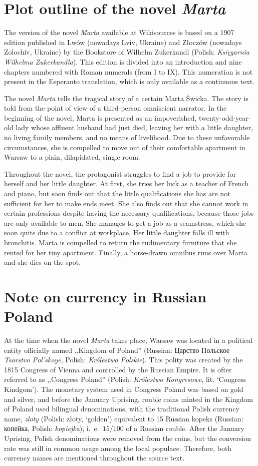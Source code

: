\section{Plot outline of the novel \textit{Marta}}
The version of the novel \textit{Marta} available at Wikisources is based on a 1907 edition published in Lwów (nowadays Lviv, Ukraine) and Złoczów (nowadays Zolochiv, Ukraine) by the Bookstore of Wilhelm Zukerkandl (Polish: \textit{Księgarnia Wilhelma Zukerkandla}).
This edition is divided into an introduction and nine chapters numbered with Roman numerals (from I to IX).
This numeration is not present in the Esperanto translation, which is only available as a continuous text.

The novel \textit{Marta} tells the tragical story of a certain Marta Świcka.
The story is told from the point of view of a third-person omniscient narrator.
In the beginning of the novel, Marta is presented as an impoverished, twenty-odd-year-old lady whose affluent husband had just died, leaving her with a little daughter, no living family members, and no means of livelihood.
Due to these unfavorable circumstances, she is compelled to move out of their comfortable apartment in Warsaw to a plain, dilapidated, single room.

Throughout the novel, the protagonist struggles to find a job to provide for herself and her little daughter.
At first, she tries her luck as a teacher of French and piano, but soon finds out that the little qualifications she has are not sufficient for her to make ends meet.
She also finds out that she cannot work in certain professions despite having the necessary qualifications, because those jobs are only available to men.
She manages to get a job as a seamstress, which she soon quits due to a conflict at workplace.
Her little daughter falls ill with bronchitis.
Marta is compelled to return the rudimentary furniture that she rented for her tiny apartment.
Finally, a horse-drawn omnibus runs over Marta and she dies on the spot.

\section{Note on currency in Russian Poland}

At the time when the novel \textit{Marta} takes place, Warsaw was located in a political entity officially named ,,Kingdom of Poland'' (Russian: {\cyrfont Царство Польское} \textit{Tsarstvo Pol'skoye}, Polish: \textit{Królestwo Polskie}).
This polity was created by the 1815 Congress of Vienna and controlled by the Russian Empire.
It is ofter referred to as ,,Congress Poland'' (Polish: \textit{Królestwo Kongresowe}, lit. `Congress Kindgom').
The monetary system used in Congress Poland was based on gold and silver, and before the January Uprising, rouble coins minted in the Kingdom of Poland used bilingual denominations, with the traditional Polish currency name, \textit{zloty} (Polish: złoty, `golden') equivalent to 15 Russian kopeks (Russian: копейка, Polish: \textit{kopiejka}), i.\ e.\ $15/100$ of a Russian rouble.
After the January Uprising, Polish denominations were removed from the coins, but the conversion rate was still in common usage among the local populace.
Therefore, both currency names are mentioned throughout the source text.
